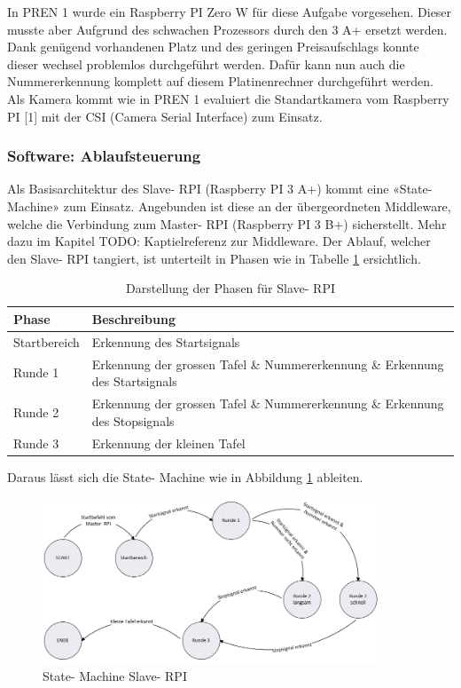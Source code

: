 \documentclass[../../main.tex]{subfiles}
\begin{document}
In PREN 1 wurde ein Raspberry PI Zero W für diese Aufgabe vorgesehen. Dieser musste aber Aufgrund des schwachen Prozessors durch den 3 A+ ersetzt werden. Dank genügend vorhandenen Platz und des geringen Preisaufschlags konnte dieser wechsel problemlos durchgeführt werden. Dafür kann nun auch die Nummererkennung komplett auf diesem Platinenrechner durchgeführt werden. Als Kamera kommt wie in PREN 1 evaluiert die Standartkamera vom Raspberry PI [1] mit der CSI (Camera Serial Interface) zum Einsatz.

\subsubsection{Software: Ablaufsteuerung}
Als Basisarchitektur des Slave- RPI (Raspberry PI 3 A+) kommt eine «State- Machine» zum Einsatz. Angebunden ist diese an der übergeordneten Middleware, welche die Verbindung zum Master- RPI (Raspberry PI 3 B+) sicherstellt. Mehr dazu im Kapitel TODO: Kaptielreferenz zur Middleware. Der Ablauf, welcher den Slave- RPI tangiert, ist unterteilt in Phasen wie in Tabelle \ref{tab:Phasentabelle} ersichtlich.

\begin{table}[H] %
  \begin{flushleft}
      \begin{tabular}{ | p{3cm} | p{10.5cm} |}
          \hline
          \textbf{Phase}  & \textbf{Beschreibung} \\\hline
          Startbereich & Erkennung des Startsignals \\\hline
          Runde 1      & Erkennung der grossen Tafel \& Nummererkennung \&  Erkennung des Startsignals \\\hline
          Runde 2      & Erkennung der grossen Tafel \& Nummererkennung \& Erkennung des Stopsignals \\\hline
          Runde 3      & Erkennung der kleinen Tafel \\\hline
      \end{tabular}
  \end{flushleft}
  \caption{Darstellung der Phasen für Slave- RPI}
  \label{tab:Phasentabelle}
\end{table}

Daraus lässt sich die State- Machine wie in Abbildung \ref{fig:state-machine} ableiten.
\vspace{1cm}

\begin{figure}[H] %
  \centering
  \includegraphics[width=0.9\textwidth]{state-machine.png}
  \caption{State- Machine Slave- RPI}
  \label{fig:state-machine}
\end{figure}
\end{document}
